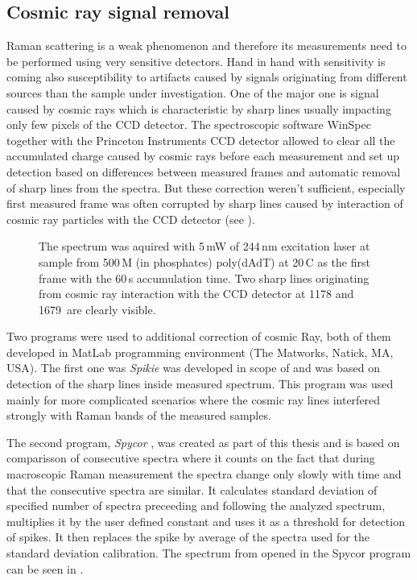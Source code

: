 \subsection{Cosmic ray signal removal}

Raman scattering is a weak phenomenon and therefore its measurements need to be
performed using very sensitive detectors.
Hand in hand with sensitivity is coming also susceptibility to artifacts caused
by signals originating from different sources than the sample under
investigation.
One of the major one is signal caused by cosmic rays which is characteristic
by sharp lines usually impacting only few pixels of the CCD detector.
The spectroscopic software WinSpec together with the Princeton Instruments
CCD detector allowed to clear all the accumulated charge caused by cosmic rays
before each measurement and set up detection based on differences between
measured frames and automatic removal of sharp lines from the spectra.
But these correction weren't sufficient, especially first measured frame
was often corrupted by sharp lines caused by interaction of cosmic ray
particles with the CCD detector
(see ).

\begin{figure}
	\centering
	
	\vspace{3mm}
	\caption[%
		UVRR pectrum containing cosmic ray signal.
	]{%
		The spectrum was aquired with 5\,mW of 244\,nm excitation laser at sample
		from 500\,M (in phosphates) poly(dAdT) at 20\,\textdegree{}C as the
		first frame with the 60\,s accumulation time.
		Two sharp lines originating from cosmic ray interaction with the CCD
		detector at 1178 and 1679\,\icm{} are clearly visible.
	}
	\label{\figlabel{cosmic_spikes:spectrum}}
\end{figure}

Two programs were used to additional correction of cosmic Ray, both of them
developed in MatLab programming environment (The Matworks, Natick, MA, USA).
The first one was \emph{Spikie}
\parencite{Spikie2011}
was developed in scope of
\textcite{Klener2011}
and was based on detection of the sharp lines inside measured spectrum.
This program was used mainly for more complicated scenarios where the cosmic
ray lines interfered strongly with Raman bands of the measured samples.

The second program, \emph{Spycor}
\parencite{Spycor2018},
was created as part of this thesis and is based on comparisson of consecutive
spectra where it counts on the fact that during macroscopic Raman measurement
the spectra change only slowly with time and that the consecutive spectra are
similar.
It calculates standard deviation of specified number of spectra preceeding and
following the analyzed spectrum, multiplies it by the user defined constant
and uses it as a threshold for detection of spikes.
It then replaces the spike by average of the spectra used for the standard
deviation calibration. The spectrum from
opened in the Spycor program can be seen in
.

